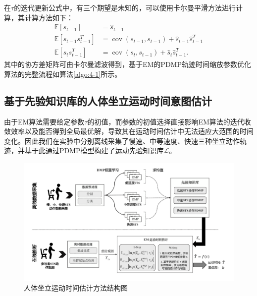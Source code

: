 在$\tau$的迭代更新公式中，有三个期望是未知的，可以使用卡尔曼平滑方法进行计算\cite{bishopPatternRecognitionMachine2006}，其计算方法如下：
\begin{equation}
    \begin{aligned}
    \mathbb{E}\left[s_{t-1}\right] & =\hat{s}_{t-1} \\
    \mathbb{E}\left[s_{t-1} s_{t-1}^T\right] & =\operatorname{cov}\left(s_{t-1}, s_{t-1}\right)+\hat{s}_{t-1} \hat{s}_{t-1}^T \\
    \mathbb{E}\left[s_t s_{t-1}^T\right] & =\operatorname{cov}\left(s_t, s_{t-1}\right)+\hat{s}_t \hat{s}_{t-1}^T .
    \end{aligned}
    \label{eq:4-36}
\end{equation}
其中的协方差矩阵可由卡尔曼滤波得到，基于EM的PDMP轨迹时间缩放参数优化算法的完整流程如算法\ref{algo:4-1}所示。

\subsection{基于先验知识库的人体坐立运动时间意图估计}
由于EM算法需要给定参数$\tau$的初值，而参数的初值选择直接影响EM算法的迭代收敛效率以及能否得到全局最优解，导致其在运动时间估计中无法适应大范围的时间变化。因此我们在实验中分别离线采集了慢速、中等速度、快速三种坐立动作轨迹，并基于此通过PDMP模型构建了运动先验知识库$\mathscr{L}$。

\begin{figure}[htb]
    \centering\includegraphics[width=1\textwidth]{figures/4-Fig-3.pdf}
    \caption{人体坐立运动时间估计方法结构图}
    \label{fig:4-3}
\end{figure}

